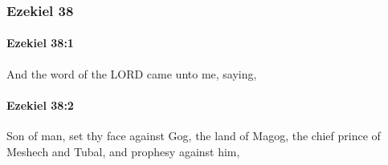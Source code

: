 	\subsubsection{Ezekiel 38} %
		\label{EZEKIEL-38}

		\paragraph{Ezekiel 38:1} %
			\label{EZEKIEL-38-1}

			And the word of the LORD came unto me, saying,


		\paragraph{Ezekiel 38:2} %
			\label{EZEKIEL-38-2}

			Son of man, set thy face against Gog, the land of Magog, the chief prince of Meshech and Tubal, and prophesy against him,

